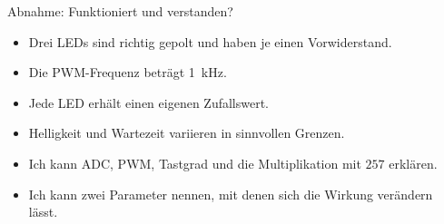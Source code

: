\begin{frame}{Abnahme: Funktioniert und verstanden?}
	\begin{itemize}
		\item[$\square$] Drei LEDs sind richtig gepolt und haben je einen Vorwiderstand.
		\item[$\square$] Die PWM-Frequenz beträgt \qty{1}{\kilo\hertz}.
		\item[$\square$] Jede LED erhält einen eigenen Zufallswert.
		\item[$\square$] Helligkeit und Wartezeit variieren in sinnvollen Grenzen.
		\item[$\square$] Ich kann ADC, PWM, Tastgrad und die Multiplikation mit $257$ erklären.
		\item[$\square$] Ich kann zwei Parameter nennen, mit denen sich die Wirkung verändern lässt.
	\end{itemize}
\end{frame}
